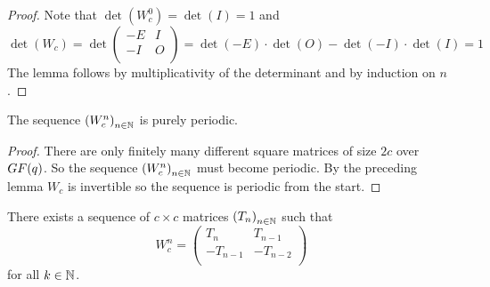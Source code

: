 \begin{proof}
  Note that $\det(W_{c}^{0}) = \det(I) = 1$ and
  \[
  \det(W_{c}) = \det
  \left(
  \begin{array}{cc}
    -E & I \\
    -I & O \\
  \end{array}
  \right)
  =
  \det(-E) \cdot \det(O) - \det(-I) \cdot \det(I)
  =
  1
  \]
  The lemma follows by multiplicativity of the determinant and
  by induction on $n$.
\end{proof}

\begin{theorem}
  The sequence $\left(W_{c}^{n}\right)_{n\in\mathbb{N}}$ is purely periodic.
\end{theorem}

\begin{proof}
  There are only finitely many different square matrices of size $2c$ over
  $GF(q)$. So the sequence $\left(W_{c}^{n}\right)_{n\in\mathbb{N}}$ must
  become periodic. By the preceding lemma $W_{c}$ is invertible so the
  sequence is periodic from the start.
\end{proof}

\begin{lemma}[$W$-structure]
  There exists a sequence of $c \times c$ matrices
  $\left(T_{n}\right)_{n\in\mathbb{N}}$ such that
  \[
  W_{c}^{n}
  =
  \left(
  \begin{array}{cc}
     T_{n} &  T_{n-1} \\
    -T_{n-1} & -T_{n-2}   \\
  \end{array}
  \right)
  \]
  for all $k\in\mathbb{N}$.
\end{lemma}


